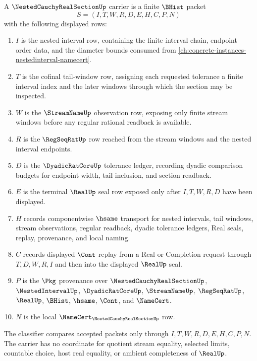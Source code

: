 \begin{definition}
\label{def:nested-cauchy-real-section-carrier}
A $\NestedCauchyRealSectionUp$ carrier is a finite $\BHist$ packet
$$
S=(I,T,W,R,D,E,H,C,P,N)
$$
with the following displayed rows:
\begin{enumerate}
\item $I$ is the nested interval row, containing the finite interval chain, endpoint order data, and the diameter bounds consumed from \autoref{ch:concrete-instances-nestedinterval-namecert}.
\item $T$ is the cofinal tail-window row, assigning each requested tolerance a finite interval index and the later windows through which the section may be inspected.
\item $W$ is the $\StreamNameUp$ observation row, exposing only finite stream windows before any regular rational readback is available.
\item $R$ is the $\RegSeqRatUp$ row reached from the stream windows and the nested interval endpoints.
\item $D$ is the $\DyadicRatCoreUp$ tolerance ledger, recording dyadic comparison budgets for endpoint width, tail inclusion, and section readback.
\item $E$ is the terminal $\RealUp$ seal row exposed only after $I,T,W,R,D$ have been displayed.
\item $H$ records componentwise $\hsame$ transport for nested intervals, tail windows, stream observations, regular readback, dyadic tolerance ledgers, Real seals, replay, provenance, and local naming.
\item $C$ records displayed $\Cont$ replay from a Real or Completion request through $T,D,W,R,I$ and then into the displayed $\RealUp$ seal.
\item $P$ is the $\Pkg$ provenance over $\NestedCauchyRealSectionUp$, $\NestedIntervalUp$, $\DyadicRatCoreUp$, $\StreamNameUp$, $\RegSeqRatUp$, $\RealUp$, $\BHist$, $\hsame$, $\Cont$, and $\NameCert$.
\item $N$ is the local $\NameCert_{\NestedCauchyRealSectionUp}$ row.
\end{enumerate}
The classifier compares accepted packets only through $I,T,W,R,D,E,H,C,P,N$. The carrier has no coordinate for quotient stream equality, selected limits, countable choice, host real equality, or ambient completeness of $\RealUp$.
\end{definition}

